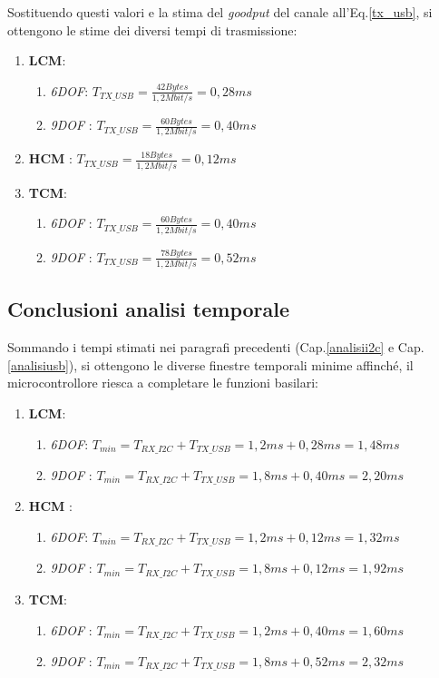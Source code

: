 Sostituendo questi valori e la stima del \textit{goodput} del canale all'Eq.\ref{tx_usb}, si ottengono le stime dei diversi tempi di trasmissione:

\begin{enumerate}
	\item \textbf{LCM}:
	\begin{enumerate}
		\item \textit{6DOF}: $ T_{TX\_USB}=  \frac{42 Bytes}{1,2 Mbit/s} = 0,28 ms $
		\item \textit{9DOF} : $ T_{TX\_USB}=  \frac{60 Bytes}{1,2 Mbit/s} = 0,40 ms $
	\end{enumerate}
	\item \textbf{HCM} : $ T_{TX\_USB}=  \frac{18 Bytes}{1,2 Mbit/s} = 0,12 ms $
	
	\item \textbf{TCM}:
	\begin{enumerate}
		\item \textit{6DOF} : $ T_{TX\_USB}=  \frac{60 Bytes}{1,2 Mbit/s} = 0,40 ms $
		\item \textit{9DOF} : $ T_{TX\_USB}=  \frac{78 Bytes}{1,2 Mbit/s} = 0,52 ms $
	\end{enumerate}
\end{enumerate}



\subsection{Conclusioni analisi temporale}
Sommando i tempi stimati nei paragrafi precedenti (Cap.\ref{analisii2c} e Cap.\ref{analisiusb}), si ottengono le diverse finestre temporali minime affinché, il microcontrollore riesca a completare le funzioni basilari:

\begin{enumerate}
	\item \textbf{LCM}:
	\begin{enumerate}
		\item \textit{6DOF}: $T_{min} = T_{RX\_I2C} + T_{TX\_USB} = 1,2 ms + 0,28 ms = 1,48 ms $
		\item \textit{9DOF} : $ T_{min} = T_{RX\_I2C} + T_{TX\_USB} = 1,8 ms + 0,40 ms = 2,20 ms $
	\end{enumerate}
	\item \textbf{HCM} :
		\begin{enumerate}
		\item \textit{6DOF}: $T_{min} = T_{RX\_I2C} + T_{TX\_USB} = 1,2 ms + 0,12 ms = 1,32 ms $
		\item \textit{9DOF} : $ T_{min} = T_{RX\_I2C} + T_{TX\_USB} = 1,8 ms + 0,12 ms = 1,92 ms $
	\end{enumerate}
	\item \textbf{TCM}:
	\begin{enumerate}
		\item \textit{6DOF} : $ T_{min} = T_{RX\_I2C} + T_{TX\_USB} = 1,2 ms + 0,40 ms = 1,60 ms $
		\item \textit{9DOF} : $T_{min} = T_{RX\_I2C} + T_{TX\_USB} = 1,8 ms + 0,52 ms = 2,32 ms $
	\end{enumerate}
\end{enumerate}

